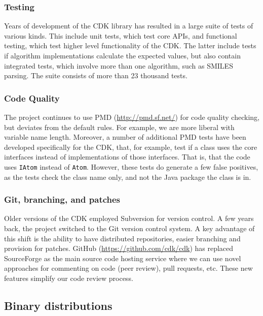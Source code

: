 \documentclass[10pt]{bmcart}
\begin{document}
\subsubsection*{Testing}

Years of development of the CDK library has resulted in a large suite of
tests of various kinds. This include unit tests, which test core APIs, and
functional testing, which test higher level functionality of the CDK. The
latter include tests if algorithm implementations calculate the expected
values, but also contain integrated tests, which involve more than one
algorithm, such as SMILES parsing. The suite consists of more than 23 thousand
tests.

\subsubsection*{Code Quality}

The project continues to use PMD (\url{http://pmd.sf.net/}) for code quality checking,
but deviates from the default rules. For example, we are more liberal with 
variable name length. Moreover, a number of additional PMD tests have been
developed specifically for the CDK, that, for example, test if a class uses
the core interfaces instead of implementations of those interfaces. That is,
that the code uses \texttt{IAtom} instead of \texttt{Atom}. However, these tests do generate a
few false positives, as the tests check the class name only, and not the
Java package the class is in.

\subsubsection*{Git, branching, and patches}

Older versions of the CDK employed Subversion for version control. A
few years back, the project switched to the Git version control
system. A key advantage of this shift is the ability to have
distributed repositories, easier branching and provision for
patches. GitHub (\url{https://github.com/cdk/cdk}) has replaced
SourceForge as the main source code hosting service where we can use
novel approaches for commenting on code (peer review), pull requests,
etc. These new features simplify our code review process.

\subsection*{Binary distributions}
\end{document}
